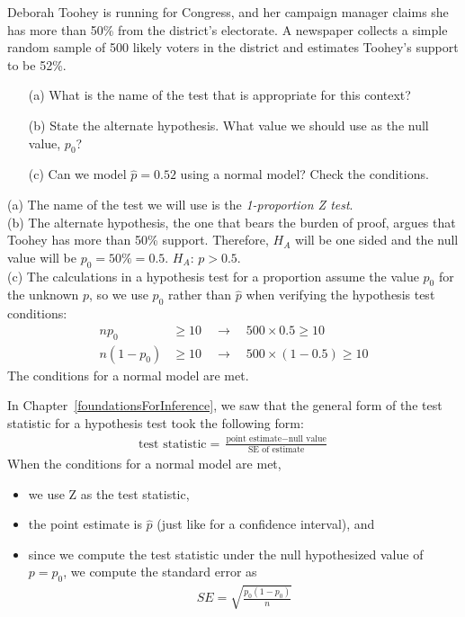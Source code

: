 \begin{example}{Deborah Toohey is running for Congress, and her campaign manager claims she has more than 50\% from the district's electorate. A newspaper collects a simple random sample of 500 likely voters in the district and estimates Toohey's support to be 52\%.
\begin{itemize}
\item[(a)] What is the name of the test that is appropriate for this context?
\item[(b)] State the alternate hypothesis. What value we should use as the null value, $p_{0}$?
\item[(c)] Can we model $\hat{p} = 0.52$ using a normal model? Check the conditions.
\end{itemize}}
\label{TooheyTestNameAndConditionExample}
(a) The name of the test we will use is the \emph{1-proportion Z test}. \\[2mm]
(b) The alternate hypothesis, the one that bears the burden of proof, argues that Toohey has more than 50\% support. Therefore, $H_A$ will be one sided and the null value will be $p_0 = 50\% = 0.5$. $H_A$: $p > 0.5$. \\[2mm]
(c) The calculations in a hypothesis test for a proportion assume the value $p_0$ for the unknown $p$, so we use $p_{0}$ rather than $\hat{p}$ when verifying the hypothesis test conditions:
\begin{align*}
np_0 &\geq 10 \quad \rightarrow \quad 500\times 0.5 \geq 10 \\
n(1-p_0) &\geq 10 \quad \rightarrow \quad 500 \times (1-0.5) \geq 10
\end{align*}
The conditions for a normal model are met.
\end{example}

In Chapter~\ref{foundationsForInference}, we saw that the general form of the test statistic for a hypothesis test took the following form:
\begin{align*}
\text{test statistic} = \frac{\text{point estimate} - \text{null value}}{\text{SE of estimate}}
\end{align*}
When the conditions for a normal model are met,
\begin{itemize}
\item we use Z as the test statistic,
\item the point estimate is $\hat{p}$ (just like for a confidence interval), and
\item since we compute the test statistic under the null hypothesized value of $p = p_0$, we compute the standard error as
\begin{align*}
SE = \sqrt{\frac{p_0(1-p_0)}{n}}
\end{align*}
\end{itemize}


